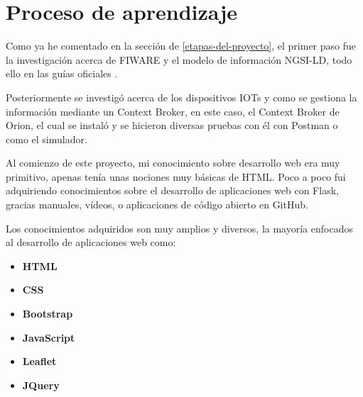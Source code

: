 \section{Proceso de aprendizaje}

Como ya he comentado en la sección de \ref{etapas-del-proyecto}, el primer paso fue la investigación acerca de FIWARE y el modelo de información NGSI-LD, todo ello en las guías oficiales \cite{fiware,fiware_ngsi_ld,etsi}. 

Posteriormente se investigó acerca de los dispositivos IOTs y como se gestiona la información mediante un Context Broker, en este caso, el Context Broker de Orion, el cual se instaló y se hicieron diversas pruebas con él con Postman o como el simulador.

Al comienzo de este proyecto, mi conocimiento sobre desarrollo web era muy primitivo, apenas tenía unas nociones muy básicas de HTML. Poco a poco fui adquiriendo conocimientos sobre el desarrollo de aplicaciones web con Flask, gracias manuales, vídeos, o aplicaciones de código abierto en GitHub.

Los conocimientos adquiridos son muy amplios y diversos, la mayoría enfocados al desarrollo de aplicaciones web como:
\begin{itemize}
    \item \textbf{HTML}
    \item \textbf{CSS}
    \item \textbf{Bootstrap}
    \item \textbf{JavaScript}
    \item \textbf{Leaflet}
    \item \textbf{JQuery}
\end{itemize}

\begin{comment}

Este apartado pretende recoger los aspectos más interesantes del desarrollo del proyecto, comentados por los autores del mismo.
Debe incluir desde la exposición del ciclo de vida utilizado, hasta los detalles de mayor relevancia de las fases de análisis, diseño e implementación.
Se busca que no sea una mera operación de copiar y pegar diagramas y extractos del código fuente, sino que realmente se justifiquen los caminos de solución que se han tomado, especialmente aquellos que no sean triviales.
Puede ser el lugar más adecuado para documentar los aspectos más interesantes del diseño y de la implementación, con un mayor hincapié en aspectos tales como el tipo de arquitectura elegido, los índices de las tablas de la base de datos, normalización y desnormalización, distribución en ficheros3, reglas de negocio dentro de las bases de datos (EDVHV GH GDWRV DFWLYDV), aspectos de desarrollo relacionados con el WWW...
Este apartado, debe convertirse en el resumen de la experiencia práctica del proyecto, y por sí mismo justifica que la memoria se convierta en un documento útil, fuente de referencia para los autores, los tutores y futuros alumnos.
\end{comment}